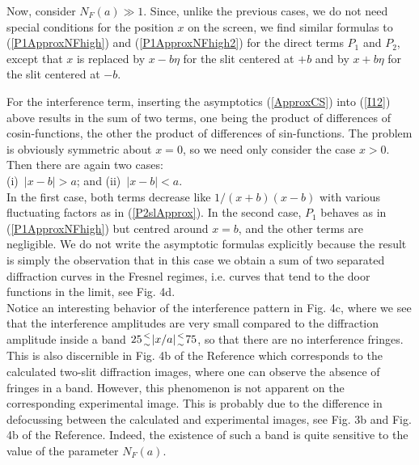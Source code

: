 \documentclass[12pt]{article}   %
\begin{document}
Now, consider $N_F(a)\gg 1$. Since, unlike the previous cases, we
do not need special conditions for the position $x$ on the screen,
we find similar formulas to (\ref{P1ApproxNFhigh}) and
(\ref{P1ApproxNFhigh2}) for the direct terms $P_1$ and $P_2$,
except that $x$ is replaced by $x-b\eta$ for the slit centered at
$+b$ and by $x+b\eta$ for the slit centered at $-b$.

For the interference term, inserting the asymptotics (\ref{ApproxCS})
into (\ref{I12}) above results in the sum of two terms, one being
the product of differences of cosin-functions, the other the product
of differences of sin-functions. The problem is obviously
symmetric about $x=0$, so we need only
consider the case $x>0$. Then there are again two cases: \\
(i)\ $|x-b| > a$; and (ii)\ $|x-b| < a$. \\
In the first case, both terms decrease like $1/(x+b)(x-b)$ with
various fluctuating factors as in (\ref{P2slApprox}). In the
second case, $P_1$ behaves as in (\ref{P1ApproxNFhigh}) but
centred around $x=b$, and the other terms are negligible. We do
not write the asymptotic formulas explicitly because the result is
simply the observation that in this case we obtain a sum of two
separated diffraction curves in the Fresnel regimes,
i.e. curves that tend to the door functions in the limit, see Fig. 4d.\\

Notice an interesting behavior of the interference pattern in Fig.
4c, where we see that the interference amplitudes are very small
compared to the diffraction amplitude inside a band $25 {< \atop
\sim} |x/a| {< \atop \sim} 75$, so that there are no interference
fringes. This is also discernible in Fig. 4b of the Reference\cite{Frabboni}
which corresponds to the calculated two-slit diffraction images,
where one can observe the absence of fringes in a band. However,
this phenomenon is not apparent on the corresponding experimental
image. This is probably due to the difference in defocussing
between the calculated and experimental images, see Fig. 3b and
Fig. 4b of the Reference.\cite{Frabboni} Indeed, the existence of such a band
is quite sensitive to the value of the parameter $N_F(a)$.
\end{document}
